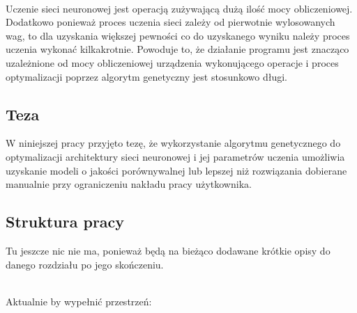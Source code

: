 \noindent\\
Uczenie sieci neuronowej jest operacją zużywającą
dużą ilość mocy obliczeniowej.
Dodatkowo ponieważ proces uczenia sieci zależy
od pierwotnie wylosowanych wag,
to dla uzyskania większej pewności
co do uzyskanego wyniku należy
proces uczenia wykonać kilkakrotnie.
Powoduje to, że działanie programu
jest znacząco uzależnione
od mocy obliczeniowej urządzenia
wykonującego operacje
i proces optymalizacji
poprzez algorytm genetyczny
jest stosunkowo długi.

\subsection*{Teza}
W niniejszej pracy przyjęto tezę,
że wykorzystanie algorytmu genetycznego
do optymalizacji architektury sieci neuronowej
i jej parametrów uczenia umożliwia uzyskanie modeli
o jakości porównywalnej lub lepszej
niż rozwiązania dobierane manualnie
przy ograniczeniu nakładu pracy użytkownika.

\subsection*{Struktura pracy}
Tu jeszcze nic nie ma,
ponieważ będą na bieżąco dodawane
krótkie opisy do danego
rozdziału po jego skończeniu.

\noindent\\
Aktualnie by wypełnić przestrzeń:\\
\lipsum[1][1-10]
